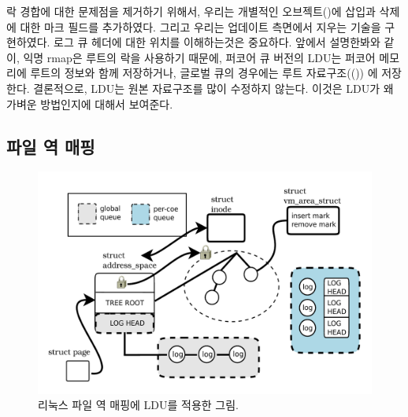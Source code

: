 락 경합에 대한 문제점을 제거하기 위해서, 우리는 개별적인 오브젝트()에 
삽입과 삭제에 대한 마크 필드를 추가하였다. 
그리고 우리는 업데이트 측면에서 지우는 기술을 구현하였다.
로그 큐 헤더에 대한 위치를 이해하는것은 중요하다.
앞에서 설명한봐와 같이, 익명 rmap은 루트의 락을 사용하기 때문에, 퍼코어 큐 버전의 LDU는 
퍼코어 메모리에 루트의 정보와 함께 저장하거나, 글로벌 큐의 경우에는 루트 자료구조(())
에 저장한다. 
결론적으로, LDU는 원본 자료구조를 많이 수정하지 않는다. 이것은 LDU가 왜 가벼운 방법인지에 
대해서 보여준다.

\subsection{파일 역 매핑}

\begin{figure}[tb]
  \begin{center}
     \includegraphics[width=1\textwidth,height=1\textheight,keepaspectratio]{fig/file_rmap}
  \end{center}
  \caption{리눅스 파일 역 매핑에 LDU를 적용한 그림.}
  \label{fig:fileramp}
\end{figure}

